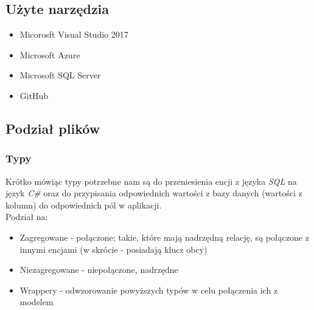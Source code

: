 \documentclass{article}
\begin{document}
\subsection*{Użyte narzędzia}
\begin{itemize}
    \item Micorosft Visual Studio 2017
    \item Microsoft Azure
    \item Microsoft SQL Server
    \item GitHub
\end{itemize}
\subsection*{Podział plików}
\subsubsection*{Typy}
Krótko mówiąc typy potrzebne nam są do przeniesienia encji z języka \textit{SQL} na język \textit{C\#} oraz do przypisania odpowiednich wartości z bazy danych (wartości z kolumn) do odpowiednich pól w aplikacji.
\\Podział na:
\begin{itemize}
    \item Zagregowane - połączone; takie, które mają nadrzędną relację, są połączone z innymi encjami (w skrócie - posiadają klucz obcy)
    \item Niezagregowane - niepołączone, nadrzędne
    \item Wrappery - odwzorowanie powyższych typów w celu połączenia ich z modelem
\end{itemize}
\end{document}
